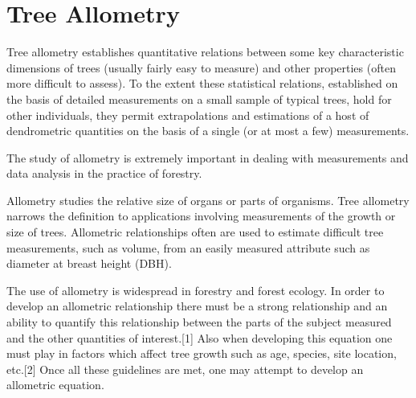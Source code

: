 \section{Tree Allometry}

Tree allometry establishes quantitative relations between some key characteristic dimensions of trees (usually fairly easy to measure) and other properties (often more difficult to assess). To the extent these statistical relations, established on the basis of detailed measurements on a small sample of typical trees, hold for other individuals, they permit extrapolations and estimations of a host of dendrometric quantities on the basis of a single (or at most a few) measurements.

The study of allometry is extremely important in dealing with measurements and data analysis in the practice of forestry. 

Allometry studies the relative size of organs or parts of organisms. Tree allometry narrows the definition to applications involving measurements of the growth or size of trees. Allometric relationships often are used to estimate difficult tree measurements, such as volume, from an easily measured attribute such as diameter at breast height (DBH).

The use of allometry is widespread in forestry and forest ecology. In order to develop an allometric relationship there must be a strong relationship and an ability to quantify this relationship between the parts of the subject measured and the other quantities of interest.[1] Also when developing this equation one must play in factors which affect tree growth such as age, species, site location, etc.[2] Once all these guidelines are met, one may attempt to develop an allometric equation. 


